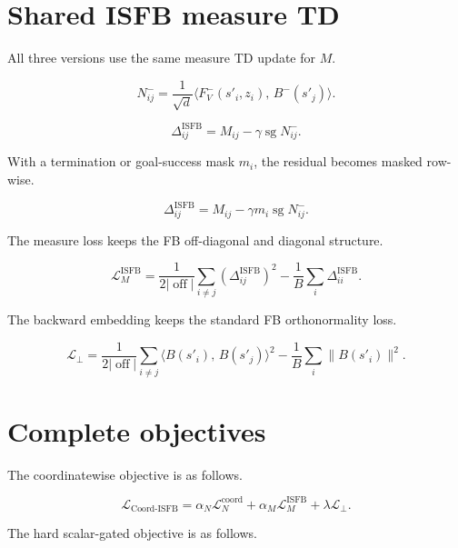 \documentclass[11pt]{article}
\newcommand{\sg}{\operatorname{sg}}
\newcommand{\inner}[2]{\langle #1,\, #2\rangle}
\newcommand{\Vmap}{F_V}
\newcommand{\Bmap}{B}
\newcommand{\off}{\operatorname{off}}
\begin{document}
\section{Shared ISFB measure TD}

All three versions use the same measure TD update for $M$.

\begin{equation}
N^{-}_{ij}=\frac{1}{\sqrt d}\inner{\Vmap^{-}(s'_i,z_i)}{\Bmap^{-}(s'_j)}.
\end{equation}

\begin{equation}
\Delta_{ij}^{\mathrm{ISFB}}=M_{ij}-\gamma\sg N^{-}_{ij}.
\end{equation}

With a termination or goal-success mask $m_i$, the residual becomes masked row-wise.

\begin{equation}
\Delta_{ij}^{\mathrm{ISFB}}=M_{ij}-\gamma m_i\sg N^{-}_{ij}.
\end{equation}

The measure loss keeps the FB off-diagonal and diagonal structure.

\begin{equation}
\mathcal L_M^{\mathrm{ISFB}}=\frac{1}{2|\off|}\sum_{i\ne j}\left(\Delta_{ij}^{\mathrm{ISFB}}\right)^2-\frac{1}{B}\sum_i\Delta_{ii}^{\mathrm{ISFB}}.
\end{equation}

The backward embedding keeps the standard FB orthonormality loss.

\begin{equation}
\mathcal L_\perp=\frac{1}{2|\off|}\sum_{i\ne j}\inner{\Bmap(s'_i)}{\Bmap(s'_j)}^2-\frac{1}{B}\sum_i\|\Bmap(s'_i)\|^2.
\end{equation}

\section{Complete objectives}

The coordinatewise objective is as follows.

\begin{equation}
\boxed{\mathcal L_{\mathrm{Coord\text{-}ISFB}}=\alpha_N\mathcal L_N^{\mathrm{coord}}+\alpha_M\mathcal L_M^{\mathrm{ISFB}}+\lambda\mathcal L_\perp.}
\end{equation}

The hard scalar-gated objective is as follows.
\end{document}
